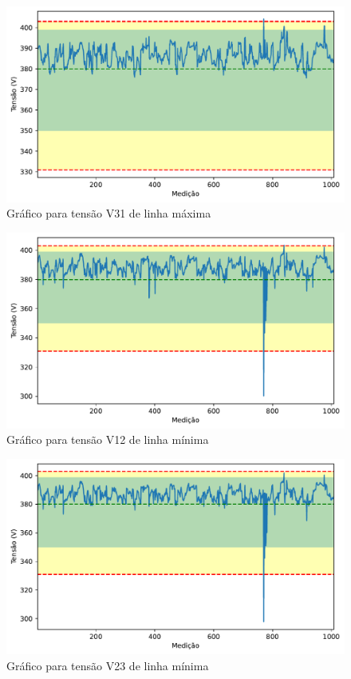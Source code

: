 \begin{figure}[H]
	\centering
	\caption{Gráfico para tensão V31 de linha máxima}
    \includegraphics[width=16cm]{illustrations/figures/a2_V31_Max.pdf}
\end{figure}

\begin{figure}[H]
	\centering
	\caption{Gráfico para tensão V12 de linha mínima}
    \includegraphics[width=16cm]{illustrations/figures/a2_V12_Min.pdf}
\end{figure}

\begin{figure}[H]
	\centering
	\caption{Gráfico para tensão V23 de linha mínima}
    \includegraphics[width=16cm]{illustrations/figures/a2_V23_Min.pdf}
\end{figure}

